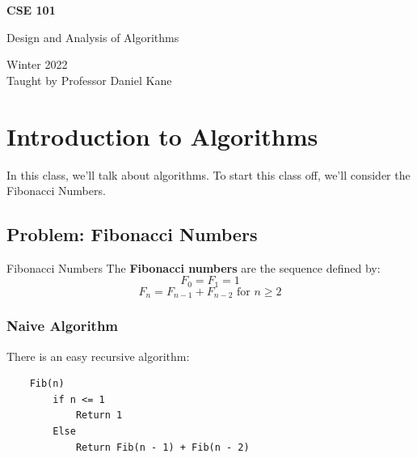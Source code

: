 \documentclass[letterpaper]{article}
\begin{document}
\begin{titlepage}
    \begin{center}
        \vspace*{1cm}
            
        \Huge
        \textbf{CSE 101}
            
        \vspace{0.5cm}
        \LARGE
        Design and Analysis of Algorithms
            
        \vspace{1.5cm}
            
        \vfill
            
        Winter 2022 \\
        Taught by Professor Daniel Kane
    \end{center}
\end{titlepage}


\newpage 

\begingroup
    \renewcommand\contentsname{Table of Contents}
    \tableofcontents
\endgroup

\newpage
{}

\section{Introduction to Algorithms}
In this class, we'll talk about algorithms. To start this class off, we'll consider the Fibonacci Numbers. 

\subsection{Problem: Fibonacci Numbers}
\begin{definition}{Fibonacci Numbers}{}
    The \textbf{Fibonacci numbers} are the sequence defined by: 
    \[F_0 = F_1 = 1\]
    \[F_n = F_{n - 1} + F_{n - 2} \text{ for } n \geq 2\]
\end{definition}

\subsubsection{Naive Algorithm}
There is an easy recursive algorithm:
\begin{verbatim}
    Fib(n)
        if n <= 1
            Return 1
        Else 
            Return Fib(n - 1) + Fib(n - 2)
\end{verbatim}
\end{document}
